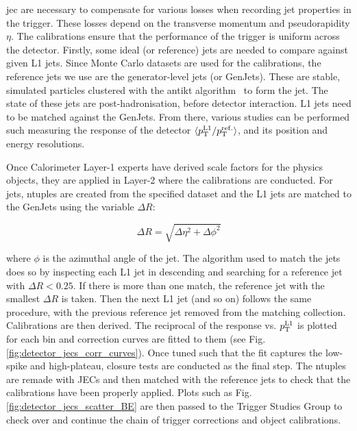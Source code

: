 \Gls{jec} are necessary to compensate for various losses when recording jet properties in the trigger. These losses depend on the transverse momentum \pt and pseudorapidity $\eta$. The calibrations ensure that the performance of the trigger is uniform across the detector. Firstly, some ideal (or reference) jets are needed to compare against given L1 jets. Since Monte Carlo datasets are used for the calibrations, the reference jets we use are the generator-level jets (or GenJets). These are stable, simulated particles clustered with the \gls{antikt} algorithm~\cite{Cacciari:2008gp} to form the jet. The state of these jets are post-hadronisation, before detector interaction. L1 jets need to be matched against the GenJets. From there, various studies can be performed such measuring the response of the detector $\langle p_{\mathrm{T}}^{{\mathrm{L1}}} / p_{\mathrm{T}}^{{\mathrm{ref.}}} \rangle$, and its position and energy resolutions.

Once Calorimeter Layer-1 experts have derived scale factors for the physics objects, they are applied in Layer-2 where the calibrations are conducted. For jets, ntuples are created from the specified dataset and the L1 jets are matched to the GenJets using the variable $\Delta R$: 

\begin{equation}
\Delta R = \sqrt{\Delta \eta^2 + \Delta \phi^2}
\label{eq:delta_r}
\end{equation}

where $\phi$ is the azimuthal angle of the jet. The algorithm used to match the jets does so by inspecting each L1 jet in descending \pt and searching for a reference jet with $\Delta R < 0.25$. If there is more than one match, the reference jet with the smallest $\Delta R$ is taken. Then the next L1 jet (and so on) follows the same procedure, with the previous reference jet removed from the matching collection. Calibrations are then derived. The reciprocal of the response vs. $p_{\mathrm{T}}^{{\mathrm{L1}}}$ is plotted for each \abseta bin and correction curves are fitted to them (see Fig. \ref{fig:detector_jecs_corr_curves}). Once tuned such that the fit captures the low-\pt spike and high-\pt plateau, closure tests are conducted as the final step. The ntuples are remade with JECs and then matched with the reference jets to check that the calibrations have been properly applied. Plots such as Fig. \ref{fig:detector_jecs_scatter_BE} are then passed to the Trigger Studies Group to check over and continue the chain of trigger corrections and object calibrations.

